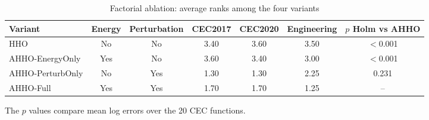 \begin{table}[htbp]
\caption{Factorial ablation: average ranks among the four variants}\label{tab:ablation-results}
\centering
\begin{tabular}{lcccccc}
\toprule
Variant & Energy & Perturbation & CEC2017 & CEC2020 & Engineering & $p$ Holm vs AHHO \\
\midrule
HHO & No & No & 3.40 & 3.60 & 3.50 & $<$0.001 \\
AHHO-EnergyOnly & Yes & No & 3.60 & 3.40 & 3.00 & $<$0.001 \\
AHHO-PerturbOnly & No & Yes & 1.30 & 1.30 & 2.25 & 0.231 \\
AHHO-Full & Yes & Yes & 1.70 & 1.70 & 1.25 & -- \\
\bottomrule
\end{tabular}
\vspace{2pt}

{\small The $p$ values compare mean log errors over the 20 CEC functions.}
\end{table}
